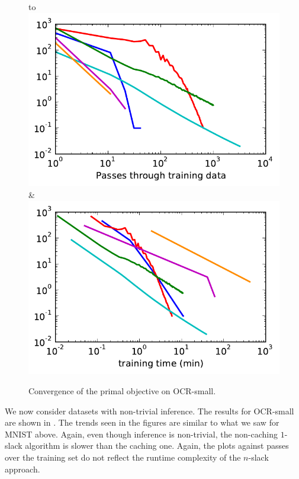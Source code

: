 \begin{figure}
    \begin{tabu} to 
    \\[-3mm]
    \includegraphics[width=\linewidth]{evaluation/images/letters_small_log}&%
    \includegraphics[width=\linewidth]{evaluation/images/letters_small_log_time}
    \end{tabu}
\caption{%
   Convergence of the primal objective on OCR-small. 
}
\end{figure}

We now consider datasets with non-trivial inference.
The results for OCR-small are shown in .
The trends seen in the figures are similar to what we saw for MNIST above.
Again, even though inference is non-trivial, the non-caching $1$-slack
algorithm is slower than the caching one. Again, the plots against passes over the training set
do not reflect the runtime complexity of the $n$-slack approach.

